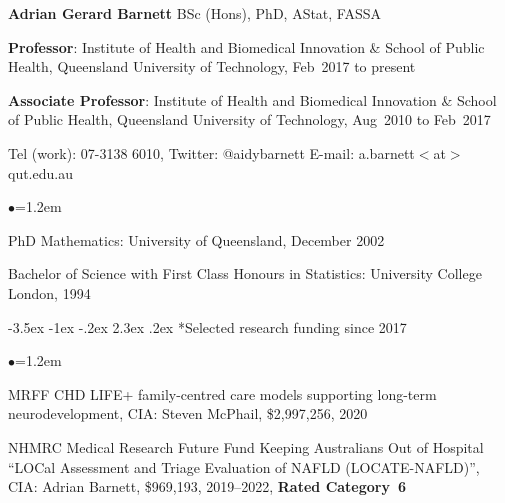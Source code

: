 \documentclass[a4paper,11pt]{article}
\makeatletter
\renewcommand\section{\@startsection {section}{1}{\z@}%
                                   {-3.5ex \@plus -1ex \@minus -.2ex}%
                                   {2.3ex \@plus.2ex}%
                                   {\normalfont\large\bfseries\color{blue}}}
\renewcommand{\labelitemi}{$\bullet$}
\makeatother
\begin{document}
\begin{raggedright}


\begin{center}
\textbf{Adrian Gerard Barnett} BSc (Hons), PhD, AStat, FASSA
\end{center}

\textbf{Professor}: Institute of Health and Biomedical Innovation \& School of Public Health, Queensland University of Technology, Feb~2017 to present

\textbf{Associate Professor}: Institute of Health and Biomedical Innovation \& School of Public Health, Queensland University of Technology, Aug~2010 to Feb~2017

Tel (work): 07-3138 6010, Twitter: @aidybarnett
E-mail: a.barnett$<$at$>$qut.edu.au

\begin{list}{\labelitemi}{\leftmargin=1.2em}\addtolength{\itemsep}{-0.5\baselineskip}
\item PhD Mathematics: University of Queensland, December 2002
\item Bachelor of Science with First Class Honours in Statistics: University College London, 1994
\end{list}

\label{papersstart}
\label{papersstop}

\section*{Selected research funding since 2017}

\begin{list}{\labelitemi}{\leftmargin=1.2em}\addtolength{\itemsep}{-0.5\baselineskip}

\item MRFF CHD LIFE+ family-centred care models supporting long-term neurodevelopment, CIA: Steven McPhail, \$2,997,256, 2020

\item NHMRC Medical Research Future Fund Keeping Australians Out of Hospital ``LOCal Assessment and Triage Evaluation of NAFLD (LOCATE-NAFLD)'', CIA: Adrian Barnett, \$969,193, 2019--2022, \textbf{Rated Category~6}


\end{list}
\end{raggedright}
\end{document}
